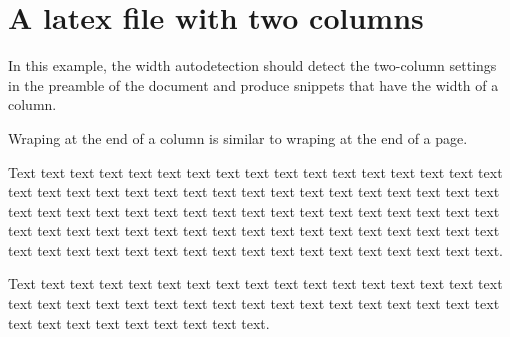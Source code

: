 \documentclass[a4paper, 12pt]{article}
\begin{document}
\section{A latex file with two columns}

In this example, the width autodetection should detect the two-column
settings in the preamble of the document and produce snippets that
have the width of a column.

{%
\parindent 0pt
\noindent
\ifx\preLilyPondExample \undefined
\else
  \expandafter\preLilyPondExample
\fi
\def\lilypondbook{}%

\ifx\postLilyPondExample \undefined
\else
  \expandafter\postLilyPondExample
\fi
}

Wraping at the end of a column is similar to wraping at the end of a
page.

Text text text text text text text text text text text text text text
text text text text text text text text text text text text text text
text text text text text text text text text text text text text text
text text text text text text text text text text text text text text
text text text text text text text text text text text text text text
text text text text text text text text text text text text text text
text.

Text text text text text text text text text text text text text text
text text text text text text text text text text text text text text
text text text text text text text text text text text text text text
text.

{%
\parindent 0pt
\noindent
\ifx\preLilyPondExample \undefined
\else
  \expandafter\preLilyPondExample
\fi
\def\lilypondbook{}%

\ifx\postLilyPondExample \undefined
\else
  \expandafter\postLilyPondExample
\fi
}
\end{document}
